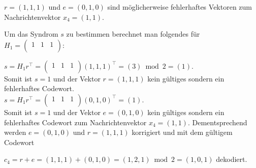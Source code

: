     
\begin{Beispiel}[Dekodierung]
    $r = (1,1,1)$ und $e = (0,1,0)$ sind möglicherweise fehlerhaftes Vektoren zum Nachrichtenvektor 
    $x_4 = (1,1)$.
    
    Um das Syndrom $s$ zu bestimmen berechnet man folgendes für  $H_1=\left( \begin{array}{rrr}
        1 & 1 & 1 \\
       \end{array}\right) 
    $:
    
    $s = H_1r^\intercal = $$\left( \begin{array}{rrr}
        1 & 1 & 1 \\
       \end{array}\right) 
    $$(1,1,1)^\intercal = (3)\bmod 2= (1).$\\
    
    Somit ist $s = 1$ und der Vektor $r = (1,1,1)$ kein gültiges sondern ein fehlerhaftes Codewort.\\
    $s = H_1r^\intercal = $$\left( \begin{array}{rrr}
        1 & 1 & 1 \\
       \end{array}\right) 
    $$(0,1,0)^\intercal = (1).$\\
    
    Somit ist $s = 1$ und der Vektor $e = (0,1,0)$ kein gültiges sondern ein fehlerhaftes Codewort zum Nachrichtenvektor 
    $x_4 = (1,1)$. Dementsprechend werden $e = (0,1,0)$ und $r = (1,1,1)$ korrigiert und mit dem gültigem Codewort
    
    $c_4 =r+e=(1,1,1)+(0,1,0)=(1,2,1)\bmod 2 = (1,0,1)$ dekodiert.\\
\end{Beispiel}
\pagebreak

